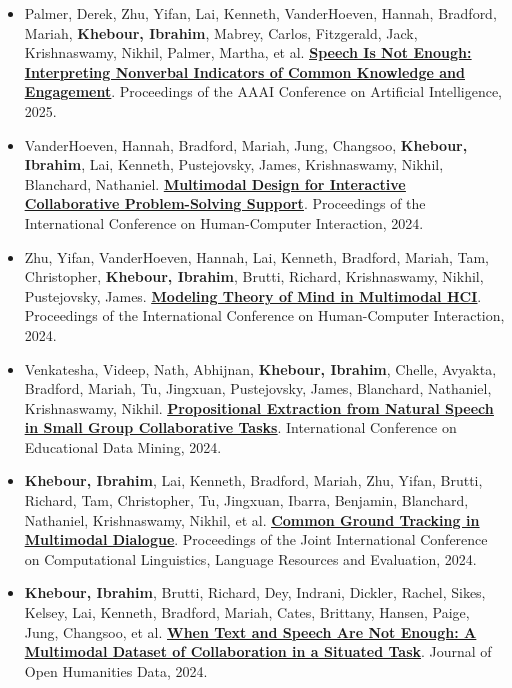\documentclass[letterpaper,11pt]{article}
\newcommand{\pubtitle}[2]{\href{#1}{\textbf{\ul{#2}}}}
\begin{document}
\begin{itemize}
\item Palmer, Derek, Zhu, Yifan, Lai, Kenneth, VanderHoeven, Hannah, Bradford, Mariah, \textbf{Khebour, Ibrahim}, Mabrey, Carlos, Fitzgerald, Jack, Krishnaswamy, Nikhil, Palmer, Martha, et al. 
\pubtitle{https://www.researchgate.net/publication/390711866_Speech_Is_Not_Enough_Interpreting_Nonverbal_Indicators_of_Common_Knowledge_and_Engagement}{Speech Is Not Enough: Interpreting Nonverbal Indicators of Common Knowledge and Engagement}. 
Proceedings of the AAAI Conference on Artificial Intelligence, 2025.

\item VanderHoeven, Hannah, Bradford, Mariah, Jung, Changsoo, \textbf{Khebour, Ibrahim}, Lai, Kenneth, Pustejovsky, James, Krishnaswamy, Nikhil, Blanchard, Nathaniel. 
\pubtitle{https://bbykitty.github.io/assets/Multimodal\%20Design\%20for\%20Interactive\%20CPS\%20Support.pdf}{Multimodal Design for Interactive Collaborative Problem-Solving Support}. 
Proceedings of the International Conference on Human-Computer Interaction, 2024.

\item Zhu, Yifan, VanderHoeven, Hannah, Lai, Kenneth, Bradford, Mariah, Tam, Christopher, \textbf{Khebour, Ibrahim}, Brutti, Richard, Krishnaswamy, Nikhil, Pustejovsky, James. 
\pubtitle{https://dl.acm.org/doi/abs/10.1007/978-3-031-60405-8_14}{Modeling Theory of Mind in Multimodal HCI}. 
Proceedings of the International Conference on Human-Computer Interaction, 2024.

\item Venkatesha, Videep, Nath, Abhijnan, \textbf{Khebour, Ibrahim}, Chelle, Avyakta, Bradford, Mariah, Tu, Jingxuan, Pustejovsky, James, Blanchard, Nathaniel, Krishnaswamy, Nikhil. 
\pubtitle{https://files.eric.ed.gov/fulltext/ED675633.pdf}{Propositional Extraction from Natural Speech in Small Group Collaborative Tasks}. 
International Conference on Educational Data Mining, 2024.

\item \textbf{Khebour, Ibrahim}, Lai, Kenneth, Bradford, Mariah, Zhu, Yifan, Brutti, Richard, Tam, Christopher, Tu, Jingxuan, Ibarra, Benjamin, Blanchard, Nathaniel, Krishnaswamy, Nikhil, et al. 
\pubtitle{https://aclanthology.org/2024.lrec-main.318.pdf}{Common Ground Tracking in Multimodal Dialogue}. 
Proceedings of the Joint International Conference on Computational Linguistics, Language Resources and Evaluation, 2024.

\item \textbf{Khebour, Ibrahim}, Brutti, Richard, Dey, Indrani, Dickler, Rachel, Sikes, Kelsey, Lai, Kenneth, Bradford, Mariah, Cates, Brittany, Hansen, Paige, Jung, Changsoo, et al. 
\pubtitle{https://par.nsf.gov/servlets/purl/10499601}{When Text and Speech Are Not Enough: A Multimodal Dataset of Collaboration in a Situated Task}. 
Journal of Open Humanities Data, 2024.


\end{itemize}
\end{document}
